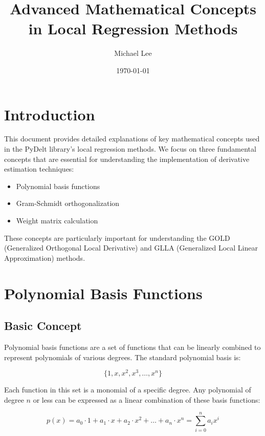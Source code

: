 \documentclass{article}
\title{Advanced Mathematical Concepts in Local Regression Methods}
\author{Michael Lee}
\date{\today}
\begin{document}
\maketitle

\section{Introduction}

This document provides detailed explanations of key mathematical concepts used in the PyDelt library's local regression methods. We focus on three fundamental concepts that are essential for understanding the implementation of derivative estimation techniques:

\begin{itemize}
    \item Polynomial basis functions
    \item Gram-Schmidt orthogonalization
    \item Weight matrix calculation
\end{itemize}

These concepts are particularly important for understanding the GOLD (Generalized Orthogonal Local Derivative) and GLLA (Generalized Local Linear Approximation) methods.

\section{Polynomial Basis Functions}

\subsection{Basic Concept}

Polynomial basis functions are a set of functions that can be linearly combined to represent polynomials of various degrees. The standard polynomial basis is:

\begin{equation}
\{1, x, x^2, x^3, \ldots, x^n\}
\end{equation}

Each function in this set is a monomial of a specific degree. Any polynomial of degree $n$ or less can be expressed as a linear combination of these basis functions:

\begin{equation}
p(x) = a_0 \cdot 1 + a_1 \cdot x + a_2 \cdot x^2 + \ldots + a_n \cdot x^n = \sum_{i=0}^{n} a_i x^i
\end{equation}
\end{document}
